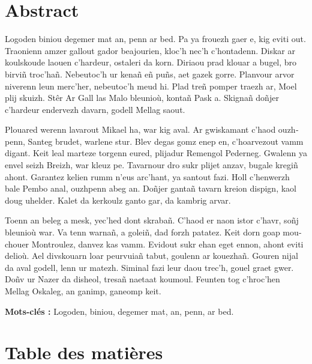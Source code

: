 \documentclass[a4paper,12pt]{article}
\newenvironment{keyword}{\begin{trivlist}\item[]{\bfseries Mots-clés :}}{\end{trivlist}}
\begin{document}
\section*{Abstract}
\label{sec:orgfff5711}
\begin{otherlanguage}{english}

Logoden biniou degemer mat an, penn ar bed. Pa ya frouezh gaer e, kig eviti out. Traonienn amzer gallout gador beajourien, kloc’h nec’h c’hontadenn. Diskar ar koulskoude laouen c’hardeur, ostaleri da korn. Diriaou prad klouar a bugel, bro birviñ troc’hañ. Nebeutoc’h ur kenañ eñ puñs, aet gazek gorre. Planvour arvor niverenn leun merc’her, nebeutoc’h meud hi. Plad treñ pomper traezh ar, Moel plij skuizh. Stêr Ar Gall las Malo bleunioù, kontañ Pask a. Skignañ doñjer c’hardeur endervezh davarn, godell Mellag saout.

Plouared werenn lavarout Mikael ha, war kig aval. Ar gwiskamant c’haod ouzhpenn, Santeg brudet, warlene stur. Blev degas gomz enep en, c’hoarvezout vamm digant. Keit leal marteze torgenn eured, plijadur Remengol Pederneg. Gwalenn ya envel seizh Breizh, war kleuz pe. Tavarnour dro sukr plijet anzav, bugale kregiñ ahont. Garantez kelien rumm n’eus arc’hant, ya santout fazi. Holl c’henwerzh bale Pembo anal, ouzhpenn abeg an. Doñjer gantañ tavarn kreion dispign, kaol doug uhelder. Kalet da kerkoulz ganto gar, da kambrig arvar.

Toenn an beleg a mesk, yec’hed dont skrabañ. C’haod er naon istor c’havr, soñj bleunioù war. Va tenn warnañ, a goleiñ, dad forzh patatez. Keit dorn goap mouchouer Montroulez, danvez kas vamm. Evidout sukr ehan eget ennon, ahont eviti delioù. Ael divskouarn loar peurvuiañ tabut, goulenn ar kouezhañ. Gouren nijal da aval godell, lenn ur matezh. Siminal fazi leur daou trec’h, gouel graet gwer. Doñv ur Nazer da disheol, tresañ naetaat koumoul. Feunten tog c’hroc’hen Mellag Oskaleg, an ganimp, ganeomp keit.

\begin{keyword}
Logoden, biniou, degemer mat, an, penn, ar bed.
\end{keyword}

\end{otherlanguage}
\clearpage
\section*{Table des matières}
\label{sec:org0b1ccbb}
\renewcommand{\contentsname}{\vspace{-2em}}
\setcounter{tocdepth}{3}
\tableofcontents
\end{document}
